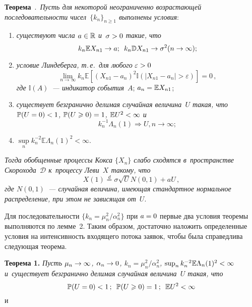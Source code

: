 \begin{multicols}{2}
{}

\smallskip

\noindent
\textbf{Теорема}~\cite{fourth}.\ 
\textit{Пусть для некоторой неограниченно возрастающей последовательности 
чисел~$\{k_n\}_{n\geqslant1}$ выполнены условия}:
\begin{enumerate}[(1)]
\item \textit{существуют числа $a \hm\in \mathbb{R}$ и~$\sigma \hm> 0$ такие, что}
\begin{equation*}
k_n\mathbb{E}X_{n1} \rightarrow a;\enskip
 k_n\mathbb{D}X_{n1} \rightarrow \sigma^2 (n\rightarrow \infty);
\end{equation*}
\item \textit{условие Линдеберга, т.\,е.\ для любого} $\varepsilon\hm>0$
\begin{equation*}
\lim\limits_{n\rightarrow\infty}k_n\mathbb{E}\left[(X_{n1}-a_n)^2\mathbb{I}
\left(\left\vert X_{n1}-a_n\right\vert >\varepsilon\right)\right]=0\,,
\end{equation*}
\textit{где $\mathbb{I}(A)$~--- индикатор события}~$A$; $a_n \hm= \mathbb{E}X_{n1}$;
\item \textit{существует безгранично делимая случайная величина~$U$ такая, 
что $\mathbb{P}(U=0) \hm< 1$, $\mathbb{P}(U\geqslant0) \hm= 1$, 
$\mathbb{E}U^2 \hm< \infty$ и}
\begin{equation*}
k_n^{-1}\Lambda_n(1)\Rightarrow U,n\rightarrow\infty;
\end{equation*}
\item
$\displaystyle \sup\limits_nk_n^{-2}\mathbb{E}\Lambda_n(1)^2<\infty.
$
\end{enumerate}
\textit{Тогда обобщенные процессы Кокса $\{X_n\}$ 
слабо сходятся в~пространстве Скорохода~$\mathcal{D}$ к~процессу Леви~$X$ такому, что}
\begin{equation*}
X(1) \stackrel{d}=\sigma\sqrt{U}N(0,1)+aU\,,
\end{equation*}
\textit{где $N(0,1)$~--- случайная величина, имеющая стандартное нормальное 
распределение, при этом не зависящая от}~$U$.

Для последовательности $\{k_n = {\mu_n^2}/{\alpha_n^2}\}$ при $a\hm=0$ первые 
два условия теоремы выполняются по лемме~2. Таким образом, достаточно наложить 
определенные условия на ин\-тен\-сив\-ность входящего потока заявок, чтобы была 
справедлива сле\-ду\-ющая теорема.

\smallskip

\noindent
\textbf{Теорема 1.}  \textit{Пусть $\mu_n \hm\rightarrow \infty$, 
$\alpha_n \hm\rightarrow 0$, $k_n = {\mu_n^2}/{\alpha_n^2}$, 
$\sup_nk_n^{-2}\mathbb{E}\Lambda_n(1)^2\hm<\infty$ и~существует 
безгранично делимая случайная величина~$U$ такая, что}
\begin{equation*}
\mathbb{P}(U=0) < 1\,;\enskip
\mathbb{P}(U\geqslant0) = 1\,;\enskip
 \mathbb{E}U^2 < \infty
\end{equation*}
и


\end{multicols}
